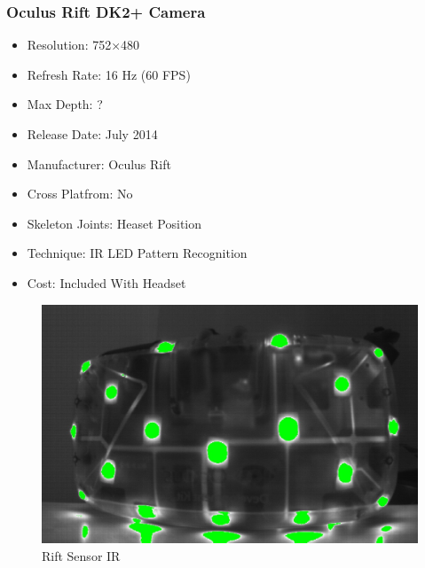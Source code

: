 \documentclass[a4paper,10pt]{article}
\begin{document}
\subsubsection{Oculus Rift DK2+ Camera}
\begin{itemize}
  \item Resolution: 752×480
  \item Refresh Rate: 16 Hz (60 FPS)
  \item Max Depth: ?
  \item Release Date: July 2014
  \item Manufacturer: Oculus Rift
  \item Cross Platfrom: No
  \item Skeleton Joints: Heaset Position
  \item Technique: IR LED Pattern Recognition
  \item Cost: Included With Headset
\end{itemize}
\begin{figure}[H]
	\includegraphics[width=\linewidth,height=\paperheight,keepaspectratio]{riftIR.jpg}
	\caption{Rift Sensor IR}
	\label{fig:riftCam}
	\end{figure}
	\pagebreak
\end{document}
